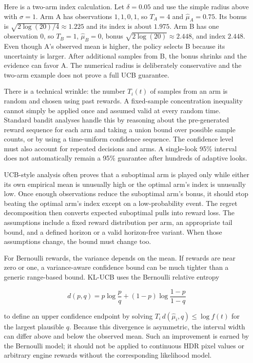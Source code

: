 Here is a two-arm index calculation. Let \(\delta=0.05\) and use the simple radius above with \(\sigma=1\). Arm A has observations \(1,1,0,1\), so \(T_A=4\) and \(\hat\mu_A=0.75\). Its bonus is \(\sqrt{2\log(20)/4}\approx1.225\) and its index is about \(1.975\). Arm B has one observation \(0\), so \(T_B=1\), \(\hat\mu_B=0\), bonus \(\sqrt{2\log(20)}\approx2.448\), and index \(2.448\). Even though A's observed mean is higher, the policy selects B because its uncertainty is larger. After additional samples from B, the bonus shrinks and the evidence can favor A. The numerical radius is deliberately conservative and the two-arm example does not prove a full UCB guarantee.

There is a technical wrinkle: the number \(T_i(t)\) of samples from an arm is random and chosen using past rewards. A fixed-sample concentration inequality cannot simply be applied once and assumed valid at every random time. Standard bandit analyses handle this by reasoning about the pre-generated reward sequence for each arm and taking a union bound over possible sample counts, or by using a time-uniform confidence sequence. The confidence level must also account for repeated decisions and arms. A single-look 95\% interval does not automatically remain a 95\% guarantee after hundreds of adaptive looks.

UCB-style analysis often proves that a suboptimal arm is played only while either its own empirical mean is unusually high or the optimal arm's index is unusually low. Once enough observations reduce the suboptimal arm's bonus, it should stop beating the optimal arm's index except on a low-probability event. The regret decomposition then converts expected suboptimal pulls into reward loss. The assumptions include a fixed reward distribution per arm, an appropriate tail bound, and a defined horizon or a valid horizon-free variant. When those assumptions change, the bound must change too.

For Bernoulli rewards, the variance depends on the mean. If rewards are near zero or one, a variance-aware confidence bound can be much tighter than a generic range-based bound. KL-UCB uses the Bernoulli relative entropy

\[
d(p,q)=p\log\frac pq+(1-p)\log\frac{1-p}{1-q}
\]

to define an upper confidence endpoint by solving \(T_i\,d(\hat\mu_i,q)\le\log f(t)\) for the largest plausible \(q\). Because this divergence is asymmetric, the interval width can differ above and below the observed mean. Such an improvement is earned by the Bernoulli model; it should not be applied to continuous HDR pixel values or arbitrary engine rewards without the corresponding likelihood model.

